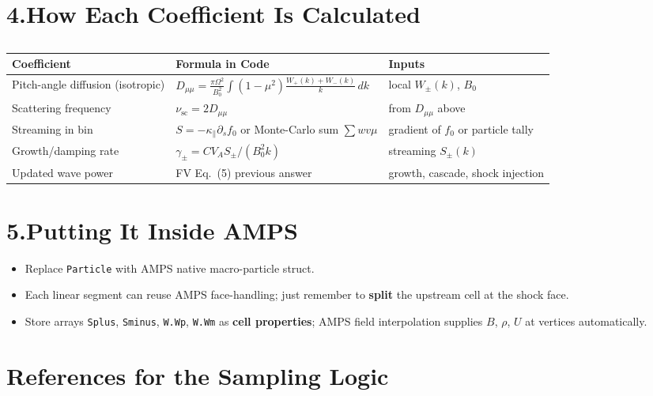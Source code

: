\section*{4.\quad How Each Coefficient Is Calculated}

\begin{table}[h!]
\centering
\begin{tabular}{|p{5.5cm}|p{7cm}|p{4cm}|}
\hline
\textbf{Coefficient} & \textbf{Formula in Code} & \textbf{Inputs} \\
\hline
Pitch-angle diffusion (isotropic) & $\displaystyle D_{\mu\mu} = \frac{\pi \Omega^{2}}{B_{0}^{2}} \int (1 - \mu^{2}) \frac{W_+(k) + W_-(k)}{k} \, dk$ & local $W_\pm(k)$, $B_0$ \\
\hline
Scattering frequency & $\nu_{\text{sc}} = 2 D_{\mu\mu}$ & from $D_{\mu\mu}$ above \\
\hline
Streaming in bin & $S = -\kappa_\parallel \partial_s f_0$ or Monte-Carlo sum $\sum w v \mu$ & gradient of $f_0$ or particle tally \\
\hline
Growth/damping rate & $\gamma_\pm = C V_A S_\pm / (B_0^{2} k)$ & streaming $S_\pm(k)$ \\
\hline
Updated wave power & FV Eq.~(5) previous answer & growth, cascade, shock injection \\
\hline
\end{tabular}
\caption*{}
\end{table}

\section*{5.\quad Putting It Inside AMPS}

\begin{itemize}
\item Replace \texttt{Particle} with AMPS native macro-particle struct.
\item Each linear segment can reuse AMPS face-handling; just remember to \textbf{split} the upstream cell at the shock face.
\item Store arrays \texttt{Splus}, \texttt{Sminus}, \texttt{W.Wp}, \texttt{W.Wm} as \textbf{cell properties}; AMPS field interpolation supplies $B$, $\rho$, $U$ at vertices automatically.
\end{itemize}

\section*{References for the Sampling Logic}

